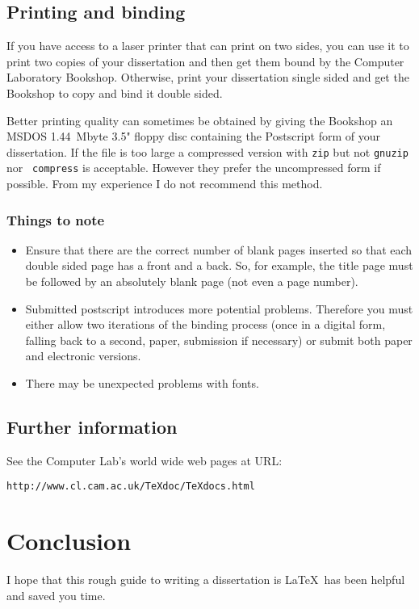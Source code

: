 \documentclass[12pt,twoside,notitlepage]{report}
\begin{document}
\section{Printing and binding}

If you have access to a laser printer that can print on two sides, you
can use it to print two copies of your dissertation and then get them
bound by the Computer Laboratory Bookshop. Otherwise, print your
dissertation single sided and get the Bookshop to copy and bind it double
sided.


Better printing quality can sometimes be obtained by giving the
Bookshop an MSDOS 1.44~Mbyte 3.5" floppy disc containing the
Postscript form of your dissertation. If the file is too large a
compressed version with {\tt zip} but not {\tt gnuzip} nor {\tt
compress} is acceptable. However they prefer the uncompressed form if
possible. From my experience I do not recommend this method.

\subsection{Things to note}

\begin{itemize}
\item Ensure that there are the correct number of blank pages inserted
so that each double sided page has a front and a back.  So, for
example, the title page must be followed by an absolutely blank page
(not even a page number).

\item Submitted postscript introduces more potential problems.
Therefore you must either allow two iterations of the binding process
(once in a digital form, falling back to a second, paper, submission if
necessary) or submit both paper and electronic versions.

\item There may be unexpected problems with fonts.

\end{itemize}

\section{Further information}

See the Computer Lab's world wide web pages at URL:

{\tt http://www.cl.cam.ac.uk/TeXdoc/TeXdocs.html}


\cleardoublepage
\chapter{Conclusion}

I hope that this rough guide to writing a dissertation is \LaTeX\ has
been helpful and saved you time.
\end{document}
